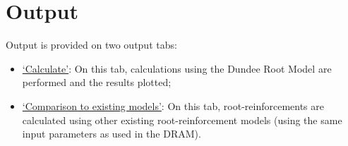 \documentclass[a4 paper, 11  pt]{article}
\begin{document}

\section{Output}

Output is provided on two output tabs:
\begin{itemize}
	\parskip=1pt
	\itemsep=0pt
	\item \hyperref[sec:outputdrm]{`Calculate'}: On this tab, calculations using the Dundee Root Model are performed and the results plotted; 
	\item \hyperref[sec:outputdrm]{`Comparison to existing models'}: On this tab, root-reinforcements are calculated using other existing root-reinforcement models (using the same input parameters as used in the DRAM).
\end{itemize}

\end{document}
